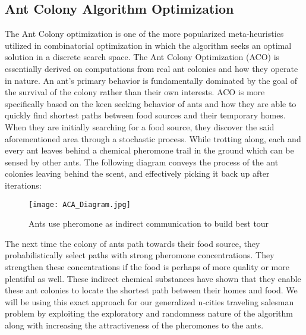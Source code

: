 \documentclass{article}
\begin{document}
\subsection{Ant Colony Algorithm Optimization}
The Ant Colony optimization is one of the more popularized meta-heuristics utilized in combinatorial optimization in which the algorithm seeks an optimal solution in a discrete search space. The Ant Colony Optimization (ACO) is essentially derived on computations from real ant colonies and how they operate in nature. An ant's primary behavior is fundamentally dominated by the goal of the survival of the colony rather than their own interests. ACO is more specifically based on the keen seeking behavior of ants and how they are able to quickly find shortest paths between food sources and their temporary homes. When they are initially searching for a food source, they discover the said aforementioned area through a stochastic process. While trotting along, each and every ant leaves behind a chemical pheromone trail in the ground which can be sensed by other ants. The following diagram conveys the process of the ant colonies leaving behind the scent, and effectively picking it back up after iterations:
\begin{figure} [H]
  \centering
  \texttt{[image: ACA\_Diagram.jpg]}
      \caption{Ants use pheromone as indirect communication to build best tour \cite{Alhanjouri}}
\end{figure}
The next time the colony of ants path towards their food source, they probabilistically select paths with strong pheromone concentrations. They strengthen these concentrations if the food is perhaps of more quality or more plentiful as well. These indirect chemical substances have shown that they enable these ant colonies to locate the shortest path between their homes and food. We will be using this exact approach for our generalized n-cities traveling salesman problem by exploiting the exploratory and randomness nature of the algorithm along with increasing the attractiveness of the pheromones to the ants.
\end{document}
